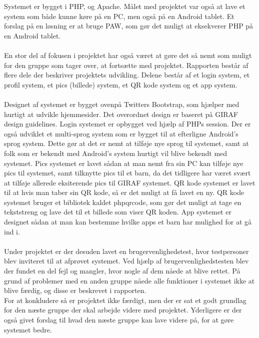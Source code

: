 Systemet er bygget i PHP,  og Apache. Målet med projektet var også at lave et system som både kunne køre på en PC, men også på en Android tablet. Et forslag på en løsning er at bruge PAW, som gør det muligt at eksekverer PHP på en Android tablet. \\ \\
En stor del af fokusen i projektet har også været at gøre det så nemt som muligt for den gruppe som tager over, at fortsætte med projektet. Rapporten består af flere dele der beskriver projektets udvikling. Delene består af et login system, et profil system, et pics (billede) system, et QR kode system og et app system. \\ \\
Designet af systemet er bygget ovenpå Twitters Bootstrap, som hjælper med hurtigt at udvikle hjemmesider. Det overordnet design er baseret på GIRAF design guidelines. Login systemet er opbygget ved hjælp af PHPs session. Der er også udviklet et multi-sprog system som er bygget til at efterligne Android's sprog system. Dette gør at det er nemt at tilføje nye sprog til systemet, samt at folk som er bekendt med Android's system hurtigt vil blive bekendt med systemet. Pics systemet er lavet sådan at man nemt fra sin PC kan tilføje nye pics til systemet, samt tilknytte pics til et barn, da det tidligere har været svært at tilføje allerede eksiterende pics til GIRAF systemet. QR kode systemet er lavet til at hvis man taber sin QR kode, så er det muligt at få lavet en ny. QR kode systemet bruger et bibliotek kaldet phpqrcode, som gør det muligt at tage en tekststreng og lave det til et billede som viser QR koden. App systemet er designet sådan at man kan bestemme hvilke apps et barn har mulighed for at gå ind i. \\ \\
Under projektet er der desuden lavet en brugervenlighedstest, hvor testpersoner blev inviteret til at afprøvet systemet. Ved hjælp af brugervenlighedstesten blev der fundet en del fejl og mangler, hvor nogle af dem nåede at blive rettet. På grund af problemer med en anden gruppe nåede alle funktioner i systemet ikke at blive færdig, og disse er beskrevet i rapporten. \\
For at konkludere så er projektet ikke færdigt, men der er sat et godt grundlag for den næste gruppe der skal arbejde videre med projektet. Yderligere er der også givet forslag til hvad den næste gruppe kan lave videre på, for at gøre systemet bedre.